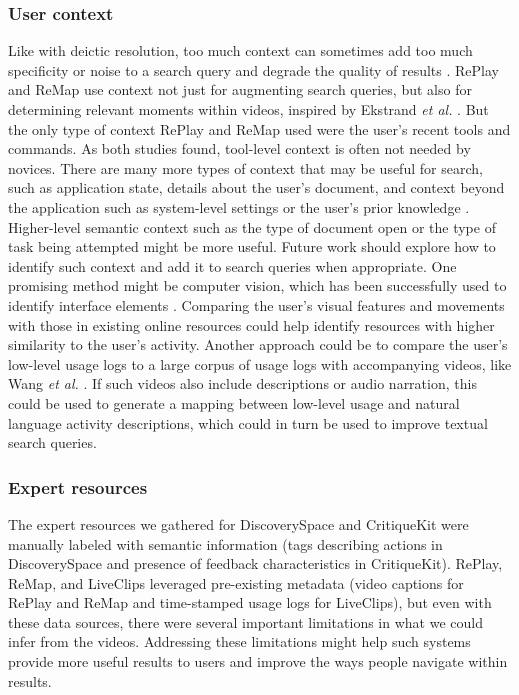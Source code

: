 \subsubsection{User context}
Like with deictic resolution, too much context can sometimes add too much specificity or noise to a search query and degrade the quality of results \cite{Finkelstein2002, Ekstrand2011}. RePlay and ReMap use context not just for augmenting search queries, but also for determining relevant moments within videos, inspired by Ekstrand \textit{et al.} \cite{Ekstrand2011}. But the only type of context RePlay and ReMap used were the user's recent tools and commands. As both studies found, tool-level context is often not needed by novices. There are many more types of context that may be useful for search, such as application state, details about the user's document, and context beyond the application such as system-level settings or the user's prior knowledge \cite{Ekstrand2011}. Higher-level semantic context such as the type of document open or the type of task being attempted might be more useful. Future work should explore how to identify such context and add it to search queries when appropriate. One promising method might be computer vision, which has been successfully used to identify interface elements \cite{Chang2011, Hurst2010, Dixon2010}. Comparing the user's visual features and movements with those in existing online resources could help identify resources with higher similarity to the user's activity. Another approach could be to compare the user's low-level usage logs to a large corpus of usage logs with accompanying videos, like Wang \textit{et al.} \cite{Wang2018}. If such videos also include descriptions or audio narration, this could be used to generate a mapping between low-level usage and natural language activity descriptions, which could in turn be used to improve textual search queries.

\subsubsection{Expert resources}
The expert resources we gathered for Discovery\-Space and CritiqueKit were manually labeled with semantic information (tags describing actions in Discovery\-Space and presence of feedback characteristics in CritiqueKit). RePlay, ReMap, and LiveClips leveraged pre-existing metadata (video captions for RePlay and ReMap and time-stamped usage logs for LiveClips), but even with these data sources, there were several important limitations in what we could infer from the videos. Addressing these limitations might help such systems provide more useful results to users and improve the ways people navigate within results.

